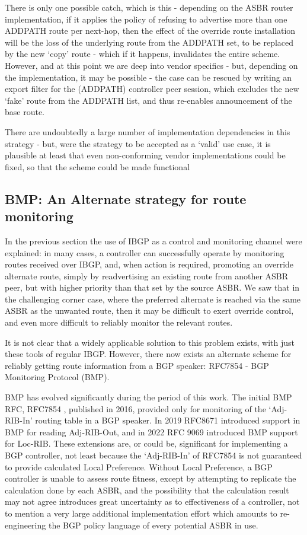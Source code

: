 There is only one possible catch, which is this - depending on the ASBR router implementation, if it applies the policy of refusing to advertise more than one ADDPATH route per next-hop, then the effect of the override route installation will be the loss of the underlying route from the ADDPATH set, to be replaced by the new `copy' route - which if it happens, invalidates the entire scheme.
However, and at this point we are deep into vendor specifics - but, depending on the implementation, it may be possible  - the case can be rescued by writing an export filter for the (ADDPATH) controller peer session, which excludes the new `fake' route from the ADDPATH list, and thus re-enables announcement of the base route.

There are undoubtedly a large number of implementation dependencies in this strategy - but, were the strategy to be accepted as a `valid' use case, it is plausible at least that even non-conforming vendor implementations could be fixed, so that the scheme could be made functional
\subsection{BMP: An Alternate strategy for route monitoring}

In the previous section the use of IBGP as a control and monitoring channel
were explained: in many cases, a controller can successfully operate by
monitoring routes received over IBGP, and, when action is required, promoting an override alternate route, simply by readvertising an existing route from another ASBR peer, but with higher priority than that set by the source ASBR.
We saw that in the challenging corner case, where the preferred alternate is reached via the same ASBR as the unwanted route, then it may be difficult to exert override control, and even more difficult to reliably
monitor the relevant routes.

It is not clear that a widely applicable solution to this problem exists, with just these tools of regular IBGP.
However, there now exists an alternate scheme for reliably getting route information from a
BGP speaker: RFC7854 - BGP Monitoring Protocol (BMP).

BMP has evolved significantly during the period of this work.
The initial BMP RFC, RFC7854 \cite{Fernando2016}, published in 2016, provided only for monitoring of the `Adj-RIB-In' routing table in a BGP speaker.
In 2019 RFC8671 \cite{rfc8671} introduced support in BMP for reading Adj-RIB-Out, and in 2022 RFC 9069\cite{rfc9069} introduced BMP support for Loc-RIB.
These extensions are, or could be, significant for implementing a BGP controller,
not least because the `Adj-RIB-In' of RFC7854 is not guaranteed to provide calculated Local Preference.
Without Local Preference, a BGP controller is unable to assess route fitness, except by attempting to replicate
the calculation done by each ASBR, and the possibility that the calculation
result may not agree introduces great uncertainty as to effectiveness of a
controller, not to mention a very large additional implementation effort which
amounts to re-engineering the BGP policy language of every potential ASBR in
use.

